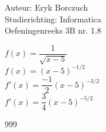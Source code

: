 \documentclass[a4paper]{article}
\begin{document}
  
\noindent \large Auteur: Eryk Borczuch \\
\noindent \large Studierichting: Informatica\\
\noindent \large Oefeningenreeks 3B nr. 1.8\\

\medskip

\normalsize

$f(x) = \dfrac{1}{\sqrt{x-5}}$\\

$f(x) = (x-5)^{-1/2}$\\

$f'(x) = \dfrac{-1}{2}(x-5)^{-3/2}$\\

$f'(x) = \dfrac{3}{4}(x-5)^{-5/2}$

\begin{thebibliography}{999}
\end{thebibliography}
\end{document}
